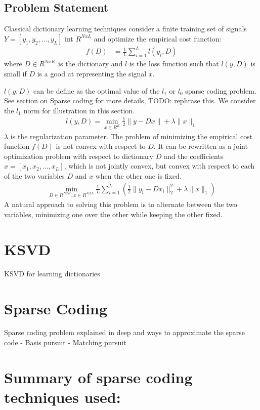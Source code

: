 \documentclass{article} %
\begin{document}
\subsection{Problem Statement}
Classical dictionary learning techniques consider a finite training set of signals $Y = [y_1, y_2, \ldots, y_L]$ int $R^{NxL}$ and optimize the empirical cost function:
\begin{align}
f(D) &= \frac{1}{L}\sum_{i=1}^{L}l(y_i, D)
\end{align} 
where $D \in R^{NxK}$ is the dictionary and $l$ is the loss function such that $l(y,D)$ is small if $D$ is a good at representing the signal $x$. 

$l(y,D)$ can be define as the optimal value of the $l_1$ or $l_0$ sparse coding problem. See section on Sparse coding for more details, TODO: rephrase this. We consider the $l_1$ norm for illustration in this section.
\begin{align}
l(y, D) = \min_{x \in R^K} \frac{1}{2}\|y - Dx\| + \lambda \|x\|_1
\end{align}
$\lambda$ is the regularization parameter. The problem of minimizing the empirical cost function $f(D)$ is not convex with respect to $D$. It can be rewritten as a joint optimization problem with respect to dictionary $D$ and the coefficients $x = [x_1, x_2, \ldots, x_L]$, which is not jointly convex, but convex with respect to each of the two variables $D$ and $x$ when the other one is fixed.
\begin{align}
\min_{D\in R^{NxK}, x\in R^{KxL}} \frac{1}{L}\sum_{i=1}^{L} \left( \frac{1}{2}\|y_i - Dx_i\|^2_2 + \lambda \|x\|_1 \right)
\end{align} 
A natural approach to solving this problem is to alternate between the two variables, minimizing one over the other while keeping the other fixed. 
 
\section{KSVD}
KSVD for learning dictionaries

\section{Sparse Coding}
Sparse coding problem explained in deep and ways to approximate the sparse code
  -	Basis pursuit
  -	Matching pursuit 


\section{Summary of sparse coding techniques used:}
\end{document}

